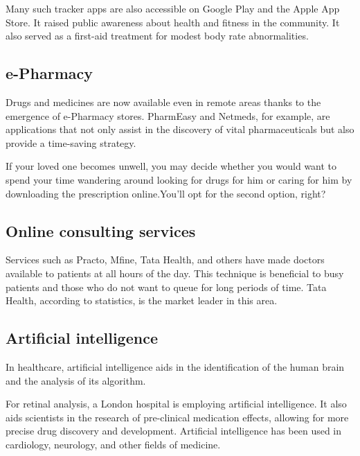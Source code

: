 \documentclass[15pt]{article}
\begin{document}
Many such tracker apps are also accessible on Google Play and the 
Apple App Store. It raised public awareness about health and fitness
in the community. It also served as a first-aid treatment for modest
body rate abnormalities.

\subsection{e-Pharmacy}
Drugs and medicines are now available even in remote areas thanks to
the emergence of e-Pharmacy stores. PharmEasy and Netmeds, for 
example, are applications that not only assist in the discovery of 
vital pharmaceuticals but also provide a time-saving strategy.

If your loved one becomes unwell, you may decide whether you would 
want to spend your time wandering around looking for drugs for him 
or caring for him by downloading the prescription online.You’ll opt 
for the second option, right?

\subsection{Online consulting services}
Services such as Practo, Mfine, Tata Health, and others have made 
doctors available to patients at all hours of the day. This 
technique is beneficial to busy patients and those who do not want 
to queue for long periods of time. Tata Health, according to 
statistics, is the market leader in this area.

\subsection{Artificial intelligence}
In healthcare, artificial intelligence aids in the identification of
the human brain and the analysis of its algorithm.

For retinal analysis, a London hospital is employing artificial 
intelligence. It also aids scientists in the research of 
pre-clinical medication effects, allowing for more precise drug 
discovery and development. Artificial intelligence has been used in 
cardiology, neurology, and other fields of medicine.
\end{document}
